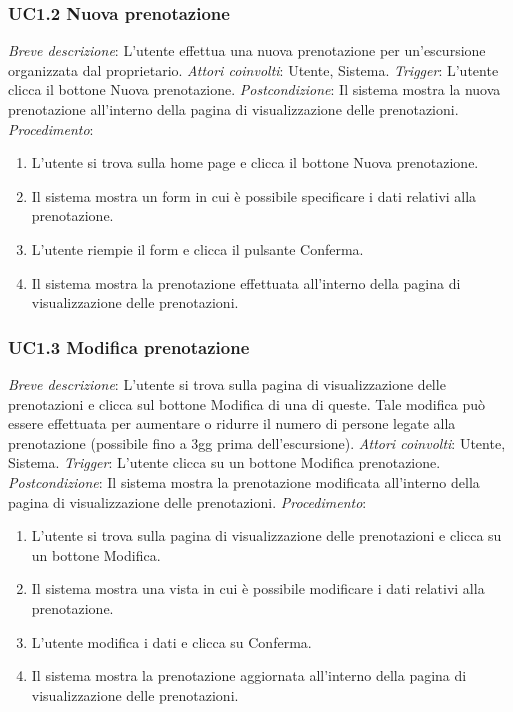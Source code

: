 \subsubsection{UC1.2 Nuova prenotazione}
\noindent \emph{Breve descrizione}: L'utente effettua una nuova prenotazione per un'escursione organizzata dal proprietario.\medbreak
\noindent \emph{Attori coinvolti}: Utente, Sistema.\medbreak
\noindent \emph{Trigger}: L'utente clicca il bottone Nuova prenotazione.\medbreak
\noindent \emph{Postcondizione}: Il sistema mostra la nuova prenotazione all'interno della pagina di visualizzazione delle prenotazioni.\medbreak
\noindent \emph{Procedimento}:

\begin{enumerate}
    \item L'utente si trova sulla home page e clicca il bottone Nuova prenotazione.
    \item Il sistema mostra un form in cui è possibile specificare i dati relativi alla prenotazione.
    \item L'utente riempie il form e clicca il pulsante Conferma.
    \item Il sistema mostra la prenotazione effettuata all'interno della pagina di visualizzazione delle prenotazioni.
\end{enumerate}

\subsubsection{UC1.3 Modifica prenotazione}
\noindent \emph{Breve descrizione}: L'utente si trova sulla pagina di visualizzazione delle prenotazioni e clicca sul bottone Modifica di una di queste. Tale modifica può essere effettuata per aumentare o ridurre il numero di persone legate alla prenotazione (possibile fino a 3gg prima dell'escursione).\medbreak
\noindent \emph{Attori coinvolti}: Utente, Sistema.\medbreak
\noindent \emph{Trigger}: L'utente clicca su un bottone Modifica prenotazione.\medbreak
\noindent \emph{Postcondizione}: Il sistema mostra la prenotazione modificata all'interno della pagina di visualizzazione delle prenotazioni.\medbreak
\noindent \emph{Procedimento}:

\begin{enumerate}
    \item L'utente si trova sulla pagina di visualizzazione delle prenotazioni e clicca su un bottone Modifica.
    \item Il sistema mostra una vista in cui è possibile modificare i dati relativi alla prenotazione.
    \item L'utente modifica i dati e clicca su Conferma.
    \item Il sistema mostra la prenotazione aggiornata all'interno della pagina di visualizzazione delle prenotazioni.
\end{enumerate}

